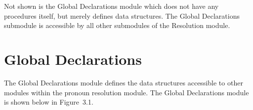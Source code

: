 \documentclass{article}
\begin{document}
Not shown is the Global Declarations module which does not have
any procedures itself, but merely defines data structures. The
Global Declarations submodule is accessible by all other
submodules of the Resolution module.

%
%

\section{Global Declarations}

The Global Declarations module defines the data structures
accessible to other modules within the pronoun resolution
module. The Global Declarations module is shown below in
Figure~3.1.
\end{document}
